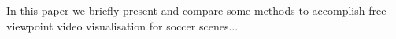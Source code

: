 In this paper we briefly present and compare some methods to accomplish free-viewpoint video 
visualisation for soccer scenes... %


